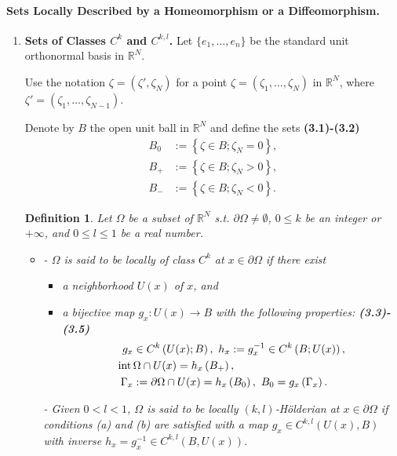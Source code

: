 \documentclass{book}
\numberwithin{equation}{section}
\newtheorem{definition}{Definition}[section]
\begin{document}
\paragraph{Sets Locally Described by a Homeomorphism or a Diffeomorphism.}
\begin{enumerate}
    \item \textbf{Sets of Classes $C^k$ and $C^{k,l}$.} Let $\{e_1,\ldots,e_n\}$ be the standard unit orthonormal basis in $\mathbb{R}^N$.
    
    Use the notation $\zeta = \left(\zeta',\zeta_N\right)$ for a point $\zeta = \left(\zeta_1,\ldots,\zeta_N\right)$ in $\mathbb{R}^N$, where $\zeta' = \left(\zeta_1,\ldots,\zeta_{N-1}\right)$.
    
    Denote by $B$ the open unit ball in $\mathbb{R}^N$ and define the sets \textbf{(3.1)-(3.2)}
    \begin{align*}
        B_0 &:= \left\{\zeta\in B;\zeta_N = 0\right\},\\
        B_+ &:= \left\{\zeta\in B;\zeta_N > 0\right\},\\
        B_- &:= \left\{\zeta\in B;\zeta_N < 0\right\}.
    \end{align*}

    \begin{definition}
        Let $\Omega$ be a subset of $\mathbb{R}^N$ s.t. $\partial\Omega\ne\emptyset$, $0\le k$ be an integer or $+\infty$, and $0\le l\le 1$ be a real number.
        \begin{itemize}
            \item[(i)] - $\Omega$ is said to be \emph{locally} of class $C^k$ at $x\in\partial\Omega$ if there exist
            \begin{itemize}
                \item[(a)] a neighborhood $U(x)$ of $x$, and
                \item[(b)] a bijective map $g_x:U(x)\to B$ with the following properties: \textbf{(3.3)-(3.5)}
                \begin{align*}
                    g_x&\in C^k\left(U(x);B\right),\ h_x := g_x^{-1}\in C^k\left(B;U(x)\right),\\
                    {\rm int}\,&\Omega\cap U(x) = h_x\left(B_+\right),\\
                    \Gamma_x &:= \partial\Omega\cap U(x) = h_x\left(B_0\right),\ B_0 = g_x\left(\Gamma_x\right).
                \end{align*}
            \end{itemize}
            - Given $0 < l < 1$, $\Omega$ is said to be \emph{locally $(k,l)$-Hölderian at} $x\in\partial\Omega$ if conditions (a) and (b) are satisfied with a map $g_x\in C^{k,l}\left(U(x),B\right)$ with inverse $h_x = g_x^{-1}\in C^{k,l}\left(B,U(x)\right)$.
            

\end{itemize}
\end{definition}
\end{enumerate}
\end{document}

